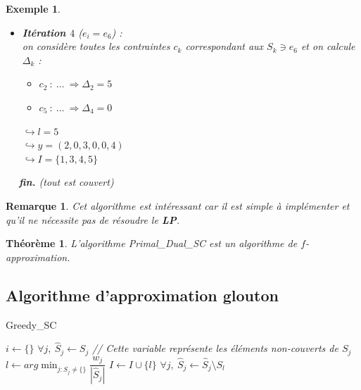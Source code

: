 \documentclass{article}
\newcommand{\titre}[1]{\textcolor{title}{#1}}
\newtheorem{exemple}{Exemple}[section]
\newtheorem{rem}{Remarque}[section]
\newtheorem{thm}{Th\'eor\`eme}[section]
\begin{document}
\begin{sffamily}
\begin{exemple}
\begin{itemize}
\item \textbf{Itération $4$} ($e_i = e_6$) :\\
on considère toutes les contraintes $c_k$ correspondant aux $S_k \ni e_6$ et on
calcule $\Delta_k$ :
	\begin{itemize}
	\item $c_2\ :\ \ldots\ \Rightarrow \Delta_2 = 5$
	\item $c_5\ :\ \ldots\ \Rightarrow \Delta_4 = 0$
	\end{itemize}
	$\hookrightarrow l = 5$\\
	$\hookrightarrow y = (2,0,3,0,0,4)$\\
	$\hookrightarrow I = \{1,3,4,5\}$
\end{itemize}
\indent$\quad$ \textbf{fin.} \textit{(tout est couvert)}
\end{exemple}

\begin{rem}
Cet algorithme est intéressant car il est simple à implémenter et qu'il ne
nécessite pas de résoudre le \titre{\textbf{LP}}.
\end{rem}

\begin{thm}
L'algorithme Primal\_Dual\_SC est un algorithme de $f$-approximation.
\end{thm}

\subsection{Algorithme d'approximation glouton}

\begin{algorithm}[h!]
\caption{Greedy\_SC}
\begin{algorithmic}[1]
\STATE $i\leftarrow \{\}$
\STATE $\forall j,\ \hat{S}_j \leftarrow S_j$ \textit{// Cette variable
représente les éléments non-couverts de $S_j$}
\STATE $l\leftarrow arg\min_{j:\hat{S}_j \neq \{\}} \dfrac{w_j}{|\hat{S}_j|}$
\STATE $I \leftarrow I\cup \{l\}$
\STATE $\forall j,\ \hat{S}_j \leftarrow \hat{S}_j \setminus S_l$
\ENDWHILE
\end{algorithmic}
\end{algorithm}


\end{sffamily}
\end{document}
